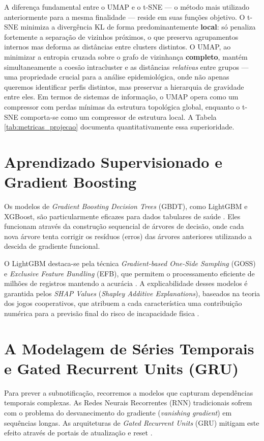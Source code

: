 A diferença fundamental entre o UMAP e o t-SNE — o método mais utilizado anteriormente para a mesma finalidade — reside em suas funções objetivo. O t-SNE minimiza a divergência KL de forma predominantemente \textbf{local}: só penaliza fortemente a separação de vizinhos próximos, o que preserva agrupamentos internos mas deforma as distâncias entre clusters distintos. O UMAP, ao minimizar a entropia cruzada sobre o grafo de vizinhança \textbf{completo}, mantém simultaneamente a coesão intracluster e as distâncias \textit{relativas} entre grupos — uma propriedade crucial para a análise epidemiológica, onde não apenas queremos identificar perfis distintos, mas preservar a hierarquia de gravidade entre eles. Em termos de sistemas de informação, o UMAP opera como um compressor com perdas mínimas da estrutura topológica global, enquanto o t-SNE comporta-se como um compressor de estrutura local. A Tabela \ref{tab:metricas_projecao} documenta quantitativamente essa superioridade.

\section{Aprendizado Supervisionado e Gradient Boosting}

Os modelos de \textit{Gradient Boosting Decision Trees} (GBDT), como LightGBM e XGBoost, são particularmente eficazes para dados tabulares de saúde \cite{chen2016xgboost, ke2017lightgbm}. Eles funcionam através da construção sequencial de árvores de decisão, onde cada nova árvore tenta corrigir os resíduos (erros) das árvores anteriores utilizando a descida de gradiente funcional.

O LightGBM destaca-se pela técnica \textit{Gradient-based One-Side Sampling} (GOSS) e \textit{Exclusive Feature Bundling} (EFB), que permitem o processamento eficiente de milhões de registros mantendo a acurácia \cite{ke2017lightgbm}. A explicabilidade desses modelos é garantida pelos \textit{SHAP Values} (\textit{Shapley Additive Explanations}), baseados na teoria dos jogos cooperativos, que atribuem a cada característica uma contribuição numérica para a previsão final do risco de incapacidade física \cite{lundberg2017shap}.
\section{A Modelagem de Séries Temporais e Gated Recurrent Units (GRU)}

Para prever a subnotificação, recorremos a modelos que capturam dependências temporais complexas. As Redes Neurais Recorrentes (RNN) tradicionais sofrem com o problema do desvanecimento do gradiente (\textit{vanishing gradient}) em sequências longas. As arquiteturas de \textit{Gated Recurrent Units} (GRU) mitigam este efeito através de portais de atualização e reset \cite{cho2014gru}. 

